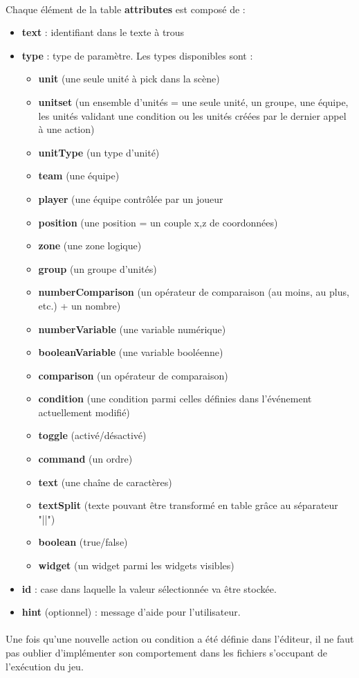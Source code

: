 \documentclass[a4paper]{article}
\begin{document}
\paragraph{ }
Chaque élément de la table \textbf{attributes} est composé de :
\begin{itemize}
\item \textbf{text} : identifiant dans le texte à trous
\item \textbf{type} : type de paramètre. Les types disponibles sont :
\begin{itemize}
\item \textbf{unit} (une seule unité à pick dans la scène)
\item \textbf{unitset} (un ensemble d'unités = une seule unité, un groupe, une équipe, les unités validant une condition ou les unités créées par le dernier appel à une action)
\item \textbf{unitType} (un type d'unité)
\item \textbf{team} (une équipe)
\item \textbf{player} (une équipe contrôlée par un joueur
\item \textbf{position} (une position = un couple x,z de coordonnées)
\item \textbf{zone} (une zone logique)
\item \textbf{group} (un groupe d'unités)
\item \textbf{numberComparison} (un opérateur de comparaison (au moins, au plus, etc.) + un nombre)
\item \textbf{numberVariable} (une variable numérique)
\item \textbf{booleanVariable} (une variable booléenne)
\item \textbf{comparison} (un opérateur de comparaison)
\item \textbf{condition} (une condition parmi celles définies dans l'événement actuellement modifié)
\item \textbf{toggle} (activé/désactivé)
\item \textbf{command} (un ordre)
\item \textbf{text} (une chaîne de caractères)
\item \textbf{textSplit} (texte pouvant être transformé en table grâce au séparateur "||")
\item \textbf{boolean} (true/false)
\item \textbf{widget} (un widget parmi les widgets visibles)
\end{itemize}
\item \textbf{id} : case dans laquelle la valeur sélectionnée va être stockée.
\item \textbf{hint} (optionnel) : message d'aide pour l'utilisateur.
\end{itemize}
\paragraph{ }
Une fois qu'une nouvelle action ou condition a été définie dans l'éditeur, il ne faut pas oublier d'implémenter son comportement dans les fichiers s'occupant de l'exécution du jeu.
\end{document}
